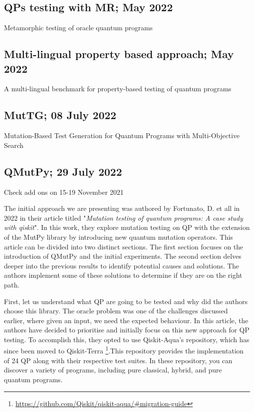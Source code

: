 \begin{itemize}
\vspace{15pt}
\subsection{QPs testing with MR; May 2022}

Metamorphic testing of oracle quantum programs \cite{abreu2022metamorphic}

\vspace{15pt}
\subsection{Multi-lingual property based approach; May 2022}

A multi-lingual benchmark for property-based testing of quantum programs \cite{pontolillo2022multi}

\vspace{15pt}
\subsection{MutTG; 08 July 2022}

Mutation-Based Test Generation for Quantum Programs with Multi-Objective Search \cite{wang2022mutation}

\vspace{15pt}
\subsection{QMutPy; 29 July 2022}
\label{Ch3.2.4:QMutPy}

Check add ons on 15-19 November 2021 \cite{fortunato2022qmutpy}

The initial approach we are presenting was authored by Fortunato, D. et all in 2022 in their article titled "\textit{Mutation testing of quantum programs: A case study with qiskit}"\cite{fortunato2022mutation}. In this work, they explore mutation testing on QP with the extension of the MutPy library by introducing new quantum mutation operators. This article can be divided into two distinct sections. The first section focuses on the introduction of QMutPy and the initial experiments. The second section delves deeper into the previous results to identify potential causes and solutions. The authors implement some of these solutions to determine if they are on the right path. \newline

First, let us understand what QP are going to be tested and why did the authors choose this library. The oracle problem was one of the challenges discussed earlier, where given an input, we need the expected behaviour. In this article, the authors have decided to prioritise and initially focus on this new approach for QP testing. To accomplish this, they opted to use Qiskit-Aqua's repository, which has since been moved to Qiskit-Terra \footnote{\url{https://github.com/Qiskit/qiskit-aqua/\#migration-guide}}.This repository provides the implementation of 24 QP along with their respective test suites. In these repository, you can discover a variety of programs, including pure classical, hybrid, and pure quantum programs.\newline


\end{itemize}
